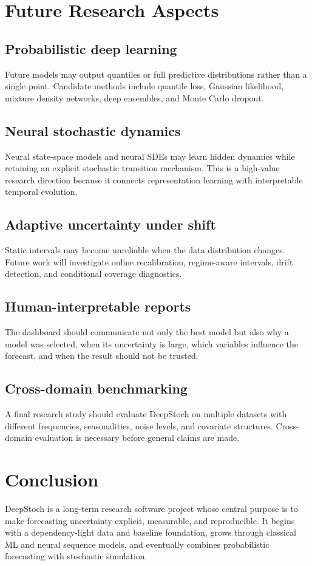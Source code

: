 \documentclass[11pt,a4paper]{report}
\begin{document}
\chapter{Future Research Aspects}
\section{Probabilistic deep learning}
Future models may output quantiles or full predictive distributions rather than a single point. Candidate methods include quantile loss, Gaussian likelihood, mixture density networks, deep ensembles, and Monte Carlo dropout.

\section{Neural stochastic dynamics}
Neural state-space models and neural SDEs may learn hidden dynamics while retaining an explicit stochastic transition mechanism. This is a high-value research direction because it connects representation learning with interpretable temporal evolution.

\section{Adaptive uncertainty under shift}
Static intervals may become unreliable when the data distribution changes. Future work will investigate online recalibration, regime-aware intervals, drift detection, and conditional coverage diagnostics.

\section{Human-interpretable reports}
The dashboard should communicate not only the best model but also why a model was selected, when its uncertainty is large, which variables influence the forecast, and when the result should not be trusted.

\section{Cross-domain benchmarking}
A final research study should evaluate DeepStoch on multiple datasets with different frequencies, seasonalities, noise levels, and covariate structures. Cross-domain evaluation is necessary before general claims are made.

\chapter{Conclusion}
DeepStoch is a long-term research software project whose central purpose is to make forecasting uncertainty explicit, measurable, and reproducible. It begins with a dependency-light data and baseline foundation, grows through classical ML and neural sequence models, and eventually combines probabilistic forecasting with stochastic simulation.
\end{document}
